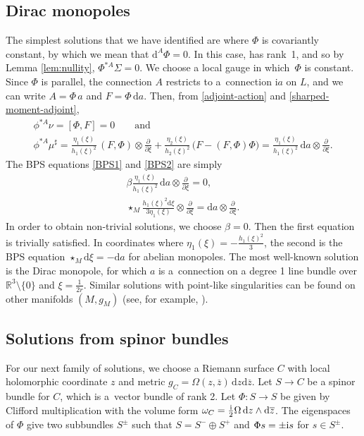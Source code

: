 \documentclass[10pt,a4paper]{amsart}
\newcommand{\ii}{{\mathrm{i}}}
\newcommand{\R}{{\mathbb{R}}}
\newcommand{\1}{{\mathbb{1}}}
\newcommand{\bdy}{\partial}
\def \d{\mathrm{d}}
\newcommand{\ol}{\overline}
\numberwithin{equation}{section}
\begin{document}
\subsection{Dirac monopoles}\label{sec:Dirac monopoles}
The simplest solutions that we have identified are where $\Phi$ is covariantly constant, by which we mean that $\d^{A}\Phi=0$. In this case, \smash{$\d^A\phi=\d\xi\frac{\bdy}{\bdy\xi}$} has rank~1, and so by Lemma \ref{lem:nullity}, $\Phi^{\ast A}\Sigma=0$.
We choose a local gauge in which~$\Phi$ is constant.
Since $\Phi$ is parallel, the connection $A$ restricts to a~connection $\ii a$ on $L$, and we can write $A=\Phi\,a$ and $F=\Phi\,\d a$. Then, from \eqref{adjoint-action} and \eqref{sharped-moment-adjoint},
\begin{gather*}
\phi^{\ast A}\nu = [\Phi,F] = 0\qquad\text{and}\\
\phi^{\ast A}\mu^\sharp = \frac{\eta_1(\xi)}{h_1(\xi)^2}\,(F,\Phi)\otimes \frac{\bdy}{\bdy\xi} + \frac{\eta_2(\xi)}{h_2(\xi)^2}\,\bigl(F-(F,\Phi)\Phi\bigr)
= \frac{\eta_1(\xi)}{h_1(\xi)^2}\,\d a\otimes \frac{\bdy}{\bdy\xi}.
\end{gather*}
The BPS equations \eqref{BPS1} and \eqref{BPS2} are simply
\begin{gather*}
\beta \frac{\eta_1(\xi)}{h_1(\xi)^2}\,\d a\otimes \frac{\bdy}{\bdy\xi}=0,\\
\star_{M} \frac{h_1(\xi)^2\d \xi}{3\eta_1(\xi)}\otimes \frac{\bdy}{\bdy\xi} = \d a\otimes \frac{\bdy}{\bdy\xi}.
\end{gather*}
In order to obtain non-trivial solutions, we choose $\beta=0$. Then the first equation is trivially satisfied. In coordinates where $\eta_1(\xi)=-\frac{h_1(\xi)^2}{3}$, the second is the BPS equation $\star_{M}\d \xi=-\d a$ for abelian monopoles. The most well-known solution is the Dirac monopole, for which $a$ is a~connection on a degree 1 line bundle over $\R^3\setminus\{0\}$ and $\xi=\tfrac{1}{2r}$. Similar solutions with point-like singularities can be found on other manifolds $(M,g_M)$ (see, for example, \cite{biswashurtubise2015monopoles}).

\subsection{Solutions from spinor bundles}
\label{sec:spinorial}

For our next family of solutions, we choose a Riemann surface $C$ with local holomorphic coordinate $z$ and metric $g_C=\Omega(z,\ol{z})\,\d z\d\ol{z}$. Let $S\to C$ be a spinor bundle for $C$, which is a~vector bundle of rank 2. Let $\Phi\colon S\to S$ be given by Clifford multiplication with the volume form $\omega_C=\frac{{\rm i}}{2}\Omega\,\d z\wedge \d\ol{z}$. The eigenspaces of $\Phi$ give two subbundles $S^\pm$ such that $S=S^-\oplus S^+$ and $\Phi s=\pm{\rm i} s$ for $s\in S^\pm$.
\end{document}
